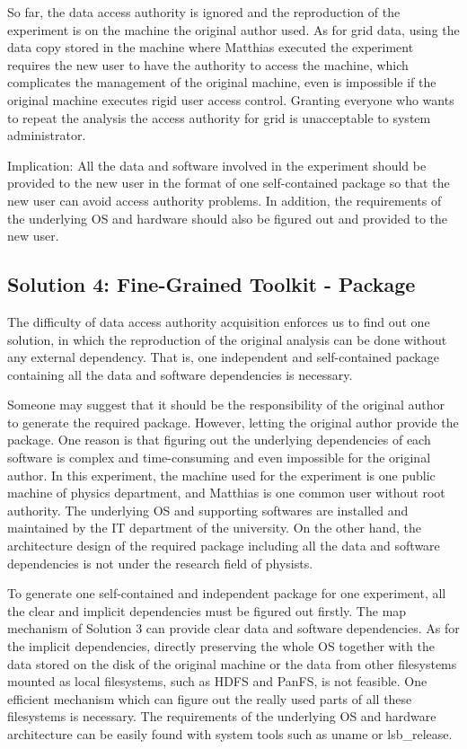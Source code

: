 \documentclass{acm_proc_article-sp}
\begin{document}
So far, the data access authority is ignored and
the reproduction of the experiment is on the machine the original author used. 
As for grid data, using the data
copy stored in the machine where Matthias executed the experiment requires the
new user to have the authority to access the machine, which complicates the
management of the original machine, even is impossible if the original machine
executes rigid user access control. Granting everyone who wants to repeat the
analysis the access authority for grid is unacceptable to system administrator. 

Implication: All the data and software involved in the experiment should be
provided to the new user in the format of one self-contained package so that
the new user can avoid 
access authority problems.
In addition, the requirements of the underlying
OS and hardware should also be figured out and provided to the new user.

\subsection{Solution 4: Fine-Grained Toolkit - Package}
The difficulty of data access authority acquisition enforces us to find out one
solution, in which the reproduction of the original analysis can be done
without any external dependency. That is, one independent and self-contained
package containing all the data and software dependencies is necessary. 

Someone may suggest that it should be the responsibility of the original author
to generate the required package. However, letting the original author provide
the package. 
One reason is that figuring out the underlying dependencies of
each software is complex and time-consuming and even impossible for the
original author. In this experiment, the machine used for the experiment is one
public machine of physics department, and Matthias is one common user without
root authority. The underlying OS and supporting softwares are installed and
maintained by the IT department of the university. On the other hand, the
architecture design of the required package including all the data and software
dependencies is not under the research field of physists.

To generate one self-contained and independent package for one experiment, all
the clear and implicit dependencies must be figured out firstly. The map mechanism
of Solution 3 can provide clear data and software dependencies. As for the
implicit dependencies, directly preserving the whole OS together with the data
stored on the disk of the original machine or the data from other filesystems
mounted as local filesystems, such as HDFS and PanFS, is not feasible. One
efficient mechanism which can figure out the really used parts of all these
filesystems is necessary. The requirements of the underlying OS and hardware
architecture can be easily found with system tools such as uname or
lsb\_release.
\end{document}
